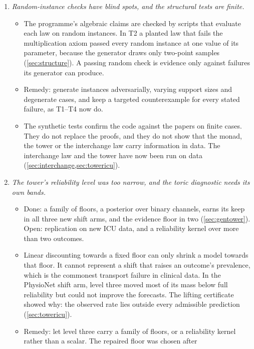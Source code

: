 \documentclass[11pt]{article}
\theoremstyle{definition}
\theoremstyle{remark}
\begin{document}
\begin{enumerate}[leftmargin=*]
\begin{itemize}[nosep]
  \item Encounter order in Diabetes 130 is assumed.
  \end{itemize}
\item \emph{Random-instance checks have blind spots, and the structural tests are finite.}
  \begin{itemize}[nosep]
  \item The programme's algebraic claims are checked by scripts that evaluate each law on random instances. In T2 a planted law that
    fails the multiplication axiom passed every random instance at one value of its parameter, because the generator draws only
    two-point samples (\cref{sec:structure}). A passing random check is evidence only against failures its generator can produce.
  \item Remedy: generate instances adversarially, varying support sizes and degenerate cases, and keep a targeted counterexample for
    every stated failure, as T1--T4 now do.
  \item The synthetic tests confirm the code against the papers on finite cases. They do not replace the proofs, and they do not show that
    the monad, the tower or the interchange law carry information in data. The interchange law and the tower have now been run on data
    (\cref{sec:interchange,sec:towericu}).
  \end{itemize}
\item \emph{The tower's reliability level was too narrow, and the toric diagnostic needs its own bands.}
  \begin{itemize}[nosep]
  \item Done: a family of floors, a posterior over binary channels, earns its keep in all three new shift arms, and the evidence floor in two
    (\cref{sec:gentower}). Open: replication on new ICU data, and a reliability kernel over more than two outcomes.
  \item Linear discounting towards a fixed floor can only shrink a model towards that floor. It cannot represent a shift that raises an
    outcome's prevalence, which is the commonest transport failure in clinical data. In the PhysioNet shift arm, level three moved most of
    its mass below full reliability but could not improve the forecasts. The lifting certificate showed why: the observed rate lies outside
    every admissible prediction (\cref{sec:towericu}).
  \item Remedy: let level three carry a family of floors, or a reliability kernel rather than a scalar. The repaired floor was chosen after

\end{itemize}
\end{enumerate}
\end{document}

